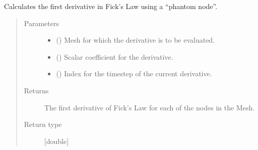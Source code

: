 \documentclass[letterpaper,10pt,english]{sphinxmanual}
\begin{document}
\begin{fulllineitems}
\label{\detokenize{derivative:derivative.first_derivative}}
\sphinxAtStartPar
Calculates the first derivative in Fick’s Law using a “phantom node”.
\begin{quote}\begin{description}
\item[{Parameters}] \leavevmode\begin{itemize}
\item {} 
\sphinxAtStartPar
{} (\sphinxstyleliteralemphasis{\sphinxupquote{{[}}}\sphinxstyleliteralemphasis{\sphinxupquote{{]}}}) \textendash{} Mesh for which the derivative is to be evaluated.

\item {} 
\sphinxAtStartPar
{} (\sphinxstyleliteralemphasis{\sphinxupquote{{[}}}\sphinxstyleliteralemphasis{\sphinxupquote{{]}}}) \textendash{} Scalar coefficient for the derivative.

\item {} 
\sphinxAtStartPar
{} (\sphinxstyleliteralemphasis{\sphinxupquote{{[}}}\sphinxstyleliteralemphasis{\sphinxupquote{{]}}}) \textendash{} Index for the timestep of the current derivative.

\end{itemize}

\item[{Returns}] \leavevmode
\sphinxAtStartPar
The first derivative of Fick’s Law for each of the nodes in the Mesh.

\item[{Return type}] \leavevmode
\sphinxAtStartPar
{[}double{]}

\end{description}\end{quote}

\end{fulllineitems}

\end{document}
